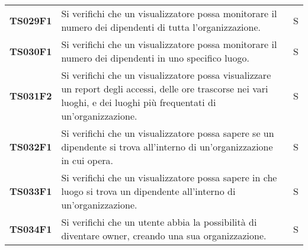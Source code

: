 \documentclass[../../piano-di-qualifica.tex]{subfiles}
\begin{document}
\begin{longtable}[H]{>{\centering\bfseries}m{3cm} >{}m{10cm} >{\centering\arraybackslash}m{3cm}}
  TS029F1            & Si verifichi che un visualizzatore possa monitorare il numero dei dipendenti di tutta l'organizzazione.
                     & S                                                                                                                                                                                                                                                  \\

  TS030F1            & Si verifichi che un visualizzatore possa monitorare il numero dei dipendenti in uno specifico luogo.
                     & S                                                                                                                                                                                                                                                  \\

  TS031F2            & Si verifichi che un visualizzatore possa visualizzare un report degli accessi, delle ore trascorse nei vari luoghi, e dei luoghi più frequentati di un'organizzazione.
                     & S                                                                                                                                                                                                                                                  \\

  TS032F1            & Si verifichi che un visualizzatore possa sapere se un dipendente si trova all'interno di un'organizzazione in cui opera.
                     & S                                                                                                                                                                                                                                                  \\

  TS033F1            & Si verifichi che un visualizzatore possa sapere in che luogo si trova un dipendente all'interno di un'organizzazione.
                     & S                                                                                                                                                                                                                                                  \\

  TS034F1            & Si verifichi che un utente abbia la possibilità di diventare owner, creando una sua organizzazione.
                     & S                                                                                                                                                                                                                                                   \\


\end{longtable}
\end{document}
